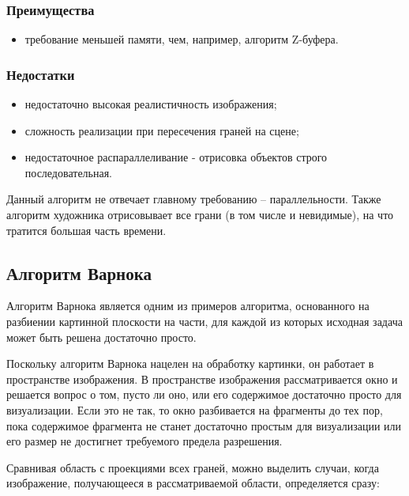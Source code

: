 \subsubsection*{Преимущества}
\begin{itemize}
\item	требование меньшей памяти, чем, например, алгоритм Z-буфера.
\end{itemize}

\subsubsection*{Недостатки}
\begin{itemize}
\item	недостаточно высокая реалистичность изображения;
\item	сложность реализации при пересечения граней на сцене;
\item   недостаточное распараллеливание - отрисовка объектов строго последовательная.
\end{itemize}

Данный алгоритм не отвечает главному требованию – параллельности. Также алгоритм художника отрисовывает все грани (в том числе и невидимые), на что тратится большая часть времени.


\subsection{Алгоритм Варнока}

 Алгоритм Варнока \cite{varnok} является одним из примеров алгоритма, основанного на разбиении картинной плоскости на части, для каждой из которых исходная задача может быть решена достаточно просто.
 
 Поскольку алгоритм Варнока нацелен на обработку картинки, он работает в пространстве изображения. В пространстве изображения рассматривается окно и решается вопрос о том, пусто ли оно, или его содержимое достаточно просто для визуализации. Если это не так, то окно разбивается на фрагменты до тех пор, пока содержимое фрагмента не станет достаточно простым для визуализации или его размер не достигнет требуемого предела разрешения.
 
 Сравнивая область с проекциями всех граней, можно выделить случаи, когда изображение, получающееся в рассматриваемой области, определяется сразу:
 
